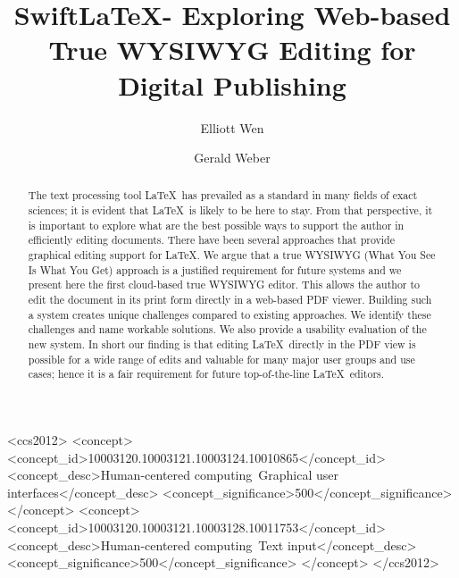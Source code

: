 \documentclass[sigconf]{acmart}
\begin{document}
\title{SwiftLaTeX- Exploring Web-based %
True WYSIWYG Editing for Digital Publishing}
 

\author{Elliott Wen}

\author{Gerald Weber}




\begin{abstract}
The text processing tool \LaTeX\ has prevailed as a standard in many fields of exact sciences; it is evident that  \LaTeX\ is likely to be here to stay. 
From that perspective, it is important to explore what are the best possible ways to support the author in efficiently editing documents. There have been several approaches that provide graphical editing support for \LaTeX. 
We argue that a true WYSIWYG (What You See Is What You Get) approach is a justified requirement for future systems and we present here the first cloud-based true WYSIWYG editor. This allows the author to edit the document in its print form directly in a web-based PDF viewer. 
Building such a system creates unique challenges compared to existing approaches. 
We identify these challenges and name workable solutions. 
We also provide a usability evaluation of the new system. 
In short our finding is that editing \LaTeX\ directly in the PDF view is possible for a wide range of edits and valuable for many major user groups and use cases; hence it is a fair requirement for future top-of-the-line \LaTeX\ editors. \end{abstract}

%
%
\begin{CCSXML}
<ccs2012>
<concept>
<concept_id>10003120.10003121.10003124.10010865</concept_id>
<concept_desc>Human-centered computing~Graphical user interfaces</concept_desc>
<concept_significance>500</concept_significance>
</concept>
<concept>
<concept_id>10003120.10003121.10003128.10011753</concept_id>
<concept_desc>Human-centered computing~Text input</concept_desc>
<concept_significance>500</concept_significance>
</concept>
</ccs2012>
\end{CCSXML}
\end{document}

